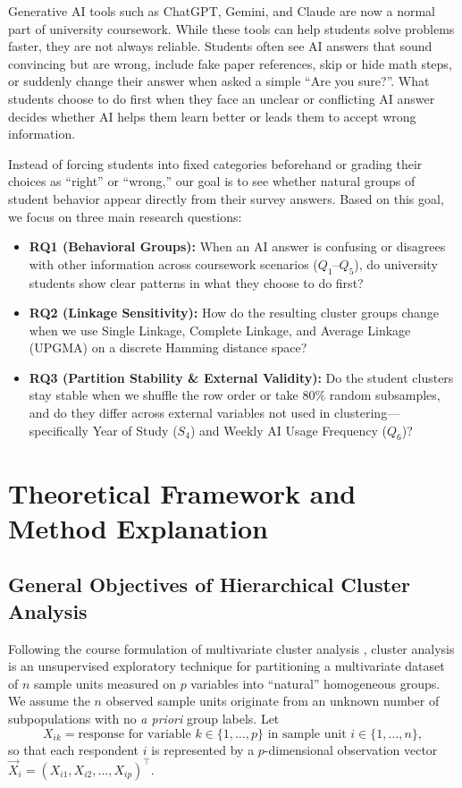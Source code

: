 \documentclass[11pt,a4paper]{article}
\begin{document}
Generative AI tools such as ChatGPT, Gemini, and Claude are now a normal part of university coursework. While these tools can help students solve problems faster, they are not always reliable. Students often see AI answers that sound convincing but are wrong, include fake paper references, skip or hide math steps, or suddenly change their answer when asked a simple ``Are you sure?''. What students choose to do first when they face an unclear or conflicting AI answer decides whether AI helps them learn better or leads them to accept wrong information.

Instead of forcing students into fixed categories beforehand or grading their choices as ``right'' or ``wrong,'' our goal is to see whether natural groups of student behavior appear directly from their survey answers. Based on this goal, we focus on three main research questions:
\begin{itemize}
    \item \textbf{RQ1 (Behavioral Groups):} When an AI answer is confusing or disagrees with other information across coursework scenarios ($Q_1$--$Q_5$), do university students show clear patterns in what they choose to do first?
    \item \textbf{RQ2 (Linkage Sensitivity):} How do the resulting cluster groups change when we use Single Linkage, Complete Linkage, and Average Linkage (UPGMA) on a discrete Hamming distance space?
    \item \textbf{RQ3 (Partition Stability \& External Validity):} Do the student clusters stay stable when we shuffle the row order or take $80\%$ random subsamples, and do they differ across external variables not used in clustering---specifically Year of Study ($S_4$) and Weekly AI Usage Frequency ($Q_6$)?
\end{itemize}

\section{Theoretical Framework and Method Explanation}

\subsection{General Objectives of Hierarchical Cluster Analysis}
Following the course formulation of multivariate cluster analysis \cite{andersson2026}, cluster analysis is an unsupervised exploratory technique for partitioning a multivariate dataset of $n$ sample units measured on $p$ variables into ``natural'' homogeneous groups. We assume the $n$ observed sample units originate from an unknown number of subpopulations with no \textit{a priori} group labels. Let
\begin{equation}
    X_{ik} = \text{response for variable } k \in \{1, \dots, p\} \text{ in sample unit } i \in \{1, \dots, n\},
\end{equation}
so that each respondent $i$ is represented by a $p$-dimensional observation vector $\vec{X}_i = (X_{i1}, X_{i2}, \dots, X_{ip})^\top$.
\end{document}
